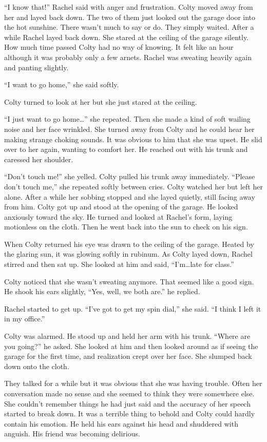 ``I know that!'' Rachel said with anger and frustration. Colty moved away from her and layed
back down. The two of them just looked out the garage door into the hot sunshine. There wasn't
much to say or do. They simply waited. After a while Rachel layed back down. She stared at the
ceiling of the garage silently. How much time passed Colty had no way of knowing. It felt like
an hour although it was probably only a few arnets. Rachel was sweating heavily again and
panting slightly.

``I want to go home,'' she said softly.

Colty turned to look at her but she just stared at the ceiling.

``I just want to go home\ldots'' she repeated. Then she made a kind of soft wailing noise and
her face wrinkled. She turned away from Colty and he could hear her making strange choking
sounds. It was obvious to him that she was upset. He slid over to her again, wanting to comfort
her. He reached out with his trunk and caressed her shoulder.

``Don't touch me!'' she yelled. Colty pulled his trunk away immediately. ``Please don't touch
me,'' she repeated softly between cries. Colty watched her but left her alone. After a while her
sobbing stopped and she layed quietly, still facing away from him. Colty got up and stood at the
opening of the garage. He looked anxiously toward the sky. He turned and looked at Rachel's
form, laying motionless on the cloth. Then he went back into the sun to check on his sign.

When Colty returned his eye was drawn to the ceiling of the garage. Heated by the glaring sun,
it was glowing softly in rubinum. As Colty layed down, Rachel stirred and then sat up. She
looked at him and said, ``I'm\ldots late for class.''

Colty noticed that she wasn't sweating anymore. That seemed like a good sign. He shook his ears
slightly, ``Yes, well, we both are.'' he replied.

Rachel started to get up. ``I've got to get my spin dial,'' she said. ``I think I left it in my
office.''

Colty was alarmed. He stood up and held her arm with his trunk. ``Where are you going?'' he
asked. She looked at him and then looked around as if seeing the garage for the first time, and
realization crept over her face. She slumped back down onto the cloth.

They talked for a while but it was obvious that she was having trouble. Often her conversation
made no sense and she seemed to think they were somewhere else. She couldn't remember things he
had just said and the accuracy of her speech started to break down. It was a terrible thing to
behold and Colty could hardly contain his emotion. He held his ears against his head and
shuddered with anguish. His friend was becoming delirious.

